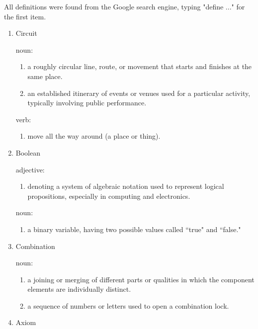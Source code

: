 \documentclass[12pt]{article}
\begin{document}
All definitions were found from the Google search engine, typing "define ..." for the first item.

\begin{enumerate}
    \item Circuit

    noun:

    \begin{enumerate}
        \item a roughly circular line, route, or movement that starts and finishes at the same place.
        \item an established itinerary of events or venues used for a particular activity, typically involving public performance.
    \end{enumerate}

    verb:

    \begin{enumerate}
        \item move all the way around (a place or thing).
    \end{enumerate}

    \item Boolean

    adjective:

    \begin{enumerate}
        \item denoting a system of algebraic notation used to represent logical propositions, especially in computing and electronics.
    \end{enumerate}

    noun:

    \begin{enumerate}
        \item a binary variable, having two possible values called ``true" and ``false."
    \end{enumerate}

    \item{Combination}

    noun:

    \begin{enumerate}
        \item a joining or merging of different parts or qualities in which the component elements are individually distinct.
        \item a sequence of numbers or letters used to open a combination lock.
    \end{enumerate}

    \item{Axiom}


\end{enumerate}
\end{document}
